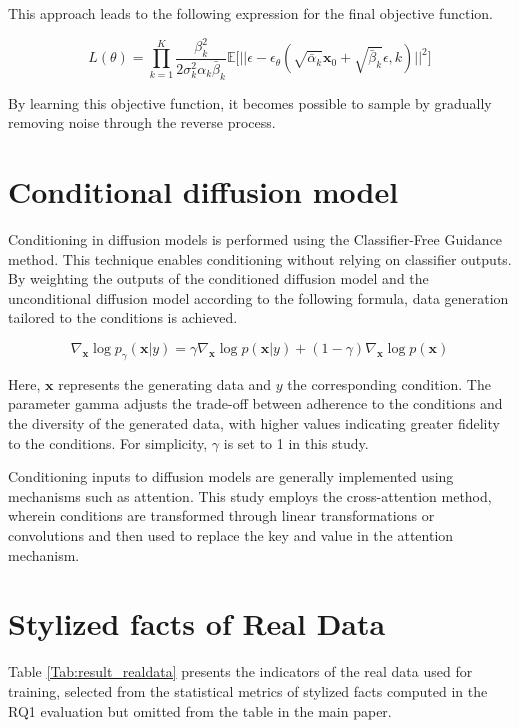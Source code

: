 \documentclass{article}
\begin{document}
This approach leads to the following expression for the final objective function. 

\begin{equation}
  L(\theta) = \prod_{k=1}^K \frac{\beta_{k}^{2}}{2 \sigma_{k}^{2} \alpha_k \bar{\beta}_k} \mathbb{E} \Big[ || \epsilon - \epsilon_{\theta}(\sqrt{\bar{\alpha}_k} \bm{x}_0 + \sqrt{\bar{\beta}_k} \epsilon, k) ||^2 \Big]
\end{equation}

By learning this objective function, it becomes possible to sample by gradually removing noise through the reverse process.


\section{Conditional diffusion model}

Conditioning in diffusion models is performed using the Classifier-Free Guidance method. This technique enables conditioning without relying on classifier outputs. By weighting the outputs of the conditioned diffusion model and the unconditional diffusion model according to the following formula, data generation tailored to the conditions is achieved. 

\begin{equation}
  \nabla_{\bm{x}} \log{ p_{\gamma}(\bm{x} | y)} = \gamma \nabla_{\bm{x}} \log{p(\bm{x}| y)} + (1 - \gamma) \nabla_{\bm{x}} \log{p(\bm{x})}
\end{equation}

Here, $\bm{x}$ represents the generating data and $y$ the corresponding condition.
The parameter gamma adjusts the trade-off between adherence to the conditions and the diversity of the generated data, with higher values indicating greater fidelity to the conditions. For simplicity, $\gamma$ is set to 1 in this study.

Conditioning inputs to diffusion models are generally implemented using mechanisms such as attention. This study employs the cross-attention method, wherein conditions are transformed through linear transformations or convolutions and then used to replace the key and value in the attention mechanism.


\section{Stylized facts of Real Data}\label{stylizedfacts_realdata}

Table \ref{Tab:result_realdata} presents the indicators of the real data used for training, selected from the statistical metrics of stylized facts computed in the RQ1 evaluation but omitted from the table in the main paper.
\end{document}
